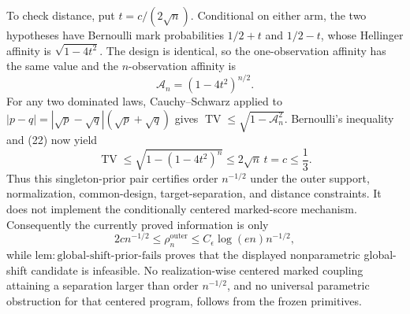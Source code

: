 To check distance, put \(t=c/(2\sqrt n)\).  Conditional on either arm, the two hypotheses have Bernoulli mark probabilities \(1/2+t\) and \(1/2-t\), whose Hellinger affinity is \(\sqrt{1-4t^2}\).  The design is identical, so the one-observation affinity has the same value and the \(n\)-observation affinity is
\[
 \mathcal A_n=(1-4t^2)^{n/2}. \tag{22}
\]
For any two dominated laws, Cauchy--Schwarz applied to
\(
 |p-q|=|\sqrt p-\sqrt q|(\sqrt p+\sqrt q)
\)
gives \(\operatorname{TV}\leq\sqrt{1-\mathcal A_n^2}\).  Bernoulli's inequality and (22) now yield
\[
 \operatorname{TV}
 \leq\sqrt{1-(1-4t^2)^n}
 \leq2\sqrt n\,t=c\leq\frac13. \tag{23}
\]
Thus this singleton-prior pair certifies order \(n^{-1/2}\) under the outer support, normalization, common-design, target-separation, and distance constraints.  It does not implement the conditionally centered marked-score mechanism.  Consequently the currently proved information is only
\[
 2c n^{-1/2}\leq\rho_n^{\mathrm{outer}}
 \leq C_{\epsilon}\log(en)n^{-1/2},
\]
while \(\mathrm{lem:global\text{-}shift\text{-}prior\text{-}fails}\) proves that the displayed nonparametric global-shift candidate is infeasible.  No realization-wise centered marked coupling attaining a separation larger than order \(n^{-1/2}\), and no universal parametric obstruction for that centered program, follows from the frozen primitives.
